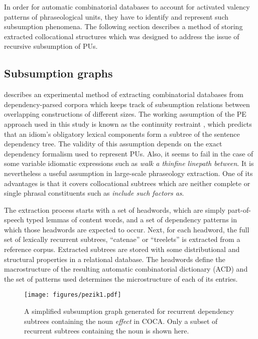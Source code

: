 \documentclass[output=paper]{langscibook}
\begin{document}
In order for automatic combinatorial databases to account for activated valency patterns of phraseological units, they have to identify and represent such subsumption phenomena. The following section describes a method of storing extracted collocational structures which was designed to address the issue of recursive subsumption of PUs. 

\subsection{Subsumption graphs}

\citet{Pęzik2018} describes an experimental method of extracting combinatorial data\-bases from dependency-parsed corpora which keeps track of subsumption relations between overlapping constructions of different sizes. The working assumption of the PE approach used in this study is known as the continuity restraint \citep{OGrady1998}, which predicts that an idiom’s obligatory lexical components form a subtree of the sentence dependency tree. The validity of this assumption depends on the exact dependency formalism used to represent PUs. Also, it seems to fail in the case of some variable idiomatic expressions such as \textit{walk a thin{\textbar}fine line{\textbar}path between}. It is nevertheless a useful assumption in large-scale phraseology extraction. One of its advantages is that it covers collocational subtrees which are neither complete or single phrasal constituents such as \textit{include such factors as}.

The extraction process starts with a set of headwords, which are simply part-of-speech typed lemmas of content words, and a set of dependency patterns in which those headwords are expected to occur. Next, for each headword, the full set of lexically recurrent subtrees, ``catenae'' \citep{OsborneEtAl2012} or ``treelets'' is extracted from a reference corpus. Extracted subtrees are stored with some distributional and structural properties in a relational database. The headwords define the macrostructure of the resulting automatic combinatorial dictionary (ACD) and the set of patterns used determines the microstructure of each of its entries.

\begin{figure}[b]
\texttt{[image: figures/pezik1.pdf]}
\caption{A simplified subsumption graph generated for recurrent dependency subtrees containing the noun \textit{effect} in COCA. Only a subset of recurrent subtrees containing the noun is shown here.\label{fig:pezik:1}}
\end{figure}
\end{document}
